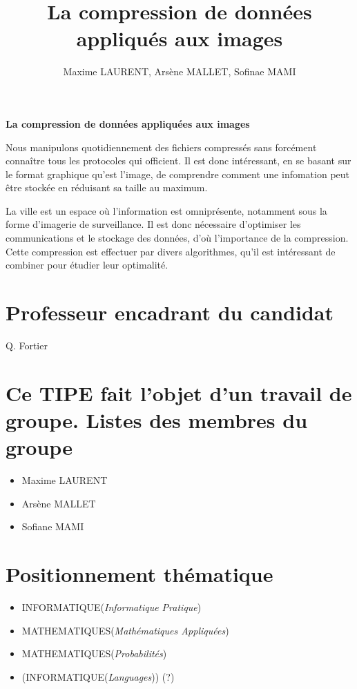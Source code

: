\documentclass[a4paper, 11pt]{article}
\author{Maxime LAURENT, Arsène MALLET, Sofinae MAMI}
\title{La compression de donn\'ees appliqu\'es aux images}
\begin{document}
    
\begin{center}
    {\textbf {\LARGE La compression de donn\'ees appliqu\'ees aux images}}
\end{center}

\vspace{5mm}

Nous manipulons quotidiennement des fichiers compressés sans forcément conna\^itre tous les protocoles qui officient. Il est donc intéressant, en se basant sur le format graphique qu'est l'image, de comprendre comment une infomation peut être stockée en réduisant sa taille au maximum.

La ville est un espace où l'information est omniprésente, notamment sous la forme d'imagerie de surveillance. Il est donc nécessaire d'optimiser les communications et le stockage des données, d'où l'importance de la compression. Cette compression est effectuer par divers algorithmes, qu'il est intéressant de combiner pour étudier leur optimalité.

\section*{Professeur encadrant du candidat}
Q. Fortier

\section*{Ce TIPE fait l'objet d'un travail de groupe. \newline Listes des membres du groupe}
\begin{itemize}
    \item Maxime LAURENT
    \item Arsène MALLET
    \item Sofiane MAMI
\end{itemize}

\section*{Positionnement th\'ematique}
\begin{itemize}
    \item INFORMATIQUE(\textit{Informatique Pratique})
    \item MATHEMATIQUES(\textit{Math\'ematiques Appliqu\'ees})
    \item MATHEMATIQUES(\textit{Probabilit\'es})
    \item \scriptsize{(INFORMATIQUE(\textit{Languages}))} (?)
\end{itemize}
\end{document}
